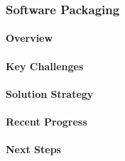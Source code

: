 \subsubsection{ Software Packaging} \label{subsubsect:sw-packaging}

\paragraph{Overview} 

\paragraph{Key  Challenges}

\paragraph{Solution Strategy}

\paragraph{Recent Progress}

\paragraph{Next Steps}

